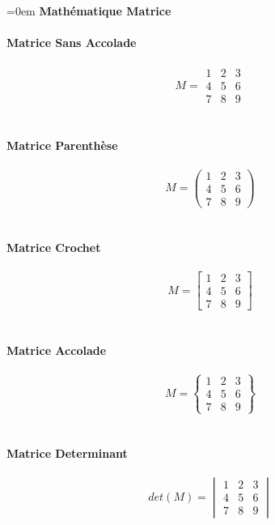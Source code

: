 \documentclass{article}
\begin{document}
\parindent=0em
\textbf{Mathématique Matrice} \\ \\
\textbf{Matrice Sans Accolade} \\ \\
$$M=\begin{matrix}
1 & 2 & 3 \\
4 & 5 & 6 \\
7 & 8 & 9
\end{matrix}$$ \\ \\
\textbf{Matrice Parenthèse} \\ \\
$$M=\begin{pmatrix}
1 & 2 & 3 \\
4 & 5 & 6 \\
7 & 8 & 9
\end{pmatrix}$$ \\ \\
\textbf{Matrice Crochet} \\ \\
$$M=\begin{bmatrix}
1 & 2 & 3 \\
4 & 5 & 6 \\
7 & 8 & 9
\end{bmatrix}$$ \\ \\
\textbf{Matrice Accolade} \\ \\
$$M=\begin{Bmatrix}
1 & 2 & 3 \\
4 & 5 & 6 \\
7 & 8 & 9
\end{Bmatrix}$$ \\ \\
\textbf{Matrice Determinant} \\ \\
$$det(M)=\begin{vmatrix}
1 & 2 & 3 \\
4 & 5 & 6 \\
7 & 8 & 9
\end{vmatrix}$$ \\ \\
\end{document}
